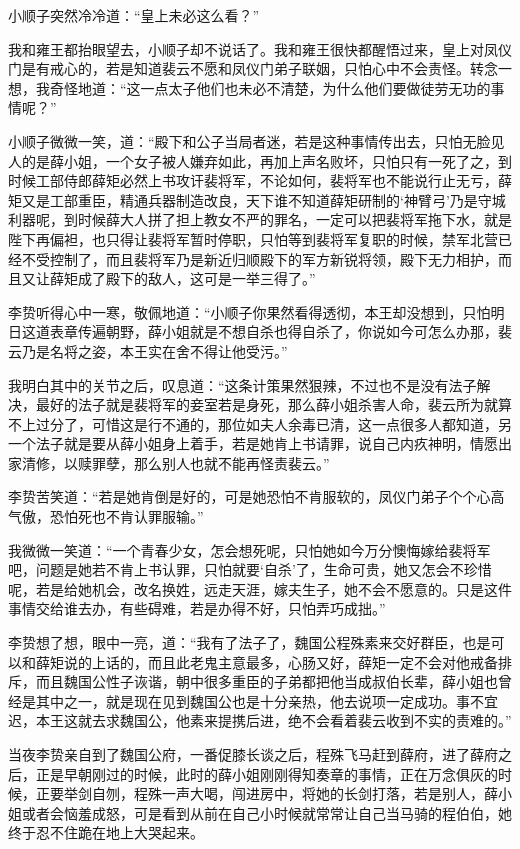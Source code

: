 小顺子突然冷冷道：“皇上未必这么看？”

我和雍王都抬眼望去，小顺子却不说话了。我和雍王很快都醒悟过来，皇上对凤仪门是有戒心的，若是知道裴云不愿和凤仪门弟子联姻，只怕心中不会责怪。转念一想，我奇怪地道：“这一点太子他们也未必不清楚，为什么他们要做徒劳无功的事情呢？”

小顺子微微一笑，道：“殿下和公子当局者迷，若是这种事情传出去，只怕无脸见人的是薛小姐，一个女子被人嫌弃如此，再加上声名败坏，只怕只有一死了之，到时候工部侍郎薛矩必然上书攻讦裴将军，不论如何，裴将军也不能说行止无亏，薛矩又是工部重臣，精通兵器制造改良，天下谁不知道薛矩研制的‘神臂弓’乃是守城利器呢，到时候薛大人拼了担上教女不严的罪名，一定可以把裴将军拖下水，就是陛下再偏袒，也只得让裴将军暂时停职，只怕等到裴将军复职的时候，禁军北营已经不受控制了，而且裴将军乃是新近归顺殿下的军方新锐将领，殿下无力相护，而且又让薛矩成了殿下的敌人，这可是一举三得了。”

李贽听得心中一寒，敬佩地道：“小顺子你果然看得透彻，本王却没想到，只怕明日这道表章传遍朝野，薛小姐就是不想自杀也得自杀了，你说如今可怎么办那，裴云乃是名将之姿，本王实在舍不得让他受污。”

我明白其中的关节之后，叹息道：“这条计策果然狠辣，不过也不是没有法子解决，最好的法子就是裴将军的妾室若是身死，那么薛小姐杀害人命，裴云所为就算不上过分了，可惜这是行不通的，那位如夫人余毒已清，这一点很多人都知道，另一个法子就是要从薛小姐身上着手，若是她肯上书请罪，说自己内疚神明，情愿出家清修，以赎罪孽，那么别人也就不能再怪责裴云。”

李贽苦笑道：“若是她肯倒是好的，可是她恐怕不肯服软的，凤仪门弟子个个心高气傲，恐怕死也不肯认罪服输。”

我微微一笑道：“一个青春少女，怎会想死呢，只怕她如今万分懊悔嫁给裴将军吧，问题是她若不肯上书认罪，只怕就要‘自杀’了，生命可贵，她又怎会不珍惜呢，若是给她机会，改名换姓，远走天涯，嫁夫生子，她不会不愿意的。只是这件事情交给谁去办，有些碍难，若是办得不好，只怕弄巧成拙。”

李贽想了想，眼中一亮，道：“我有了法子了，魏国公程殊素来交好群臣，也是可以和薛矩说的上话的，而且此老鬼主意最多，心肠又好，薛矩一定不会对他戒备排斥，而且魏国公性子诙谐，朝中很多重臣的子弟都把他当成叔伯长辈，薛小姐也曾经是其中之一，就是现在见到魏国公也是十分亲热，他去说项一定成功。事不宜迟，本王这就去求魏国公，他素来提携后进，绝不会看着裴云收到不实的责难的。”

当夜李贽亲自到了魏国公府，一番促膝长谈之后，程殊飞马赶到薛府，进了薛府之后，正是早朝刚过的时候，此时的薛小姐刚刚得知奏章的事情，正在万念俱灰的时候，正要举剑自刎，程殊一声大喝，闯进房中，将她的长剑打落，若是别人，薛小姐或者会恼羞成怒，可是看到从前在自己小时候就常常让自己当马骑的程伯伯，她终于忍不住跪在地上大哭起来。

